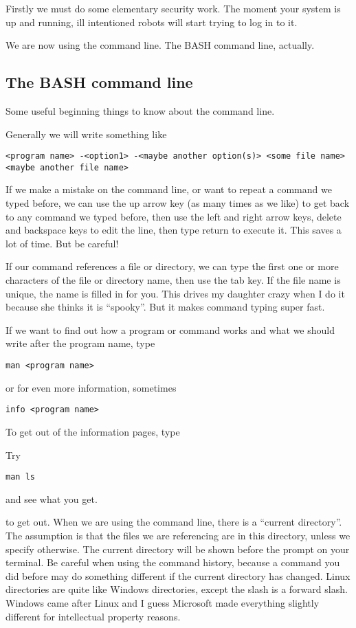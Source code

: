 \documentclass[12pt,a4paper]{article}
\begin{document}
Firstly we must do some elementary security work. The moment your system is up and running, ill intentioned robots will start trying to log in to it. 

We are now using the command line. The BASH command line, actually.

\subsection*{The BASH command line}
Some useful beginning things to know about the command line.

Generally we will write something like 

\begin{lstlisting}
<program name> -<option1> -<maybe another option(s)> <some file name>  <maybe another file name>
\end{lstlisting}


If we make a mistake on the command line, or want to repeat a command we typed before, we can use the up arrow key (as many times as we like) to get back to any command we typed before, then use the left and right arrow keys, delete and backspace keys to edit the line, then type return to execute it. This saves a lot of time. But be careful!

If our command references a file or directory, we can type the first one or more characters of the file or directory name, then use the tab key. If the file name is unique, the name is filled in for you. This drives my daughter crazy when I do it because she thinks it is “spooky”. But it makes command typing super fast. 

If we want to find out how a program or command works and what we should write after the program name, type
\begin{lstlisting}
man <program name>
\end{lstlisting}
or for even more information, sometimes
\begin{lstlisting}
info <program name>  
\end{lstlisting}
To get out of the information pages, type 



Try 
\begin{lstlisting}
man ls
\end{lstlisting}
and see what you get.



to get out.
When we are using the command line, there is a “current directory”. The assumption is that the files we are referencing are in this directory, unless we specify otherwise. The current directory will be shown before the prompt on your terminal. Be careful when using the command history, because a command you did before may do something different if the current directory has changed. Linux directories are quite like Windows directories, except the slash is a forward slash. Windows came after Linux and I guess Microsoft made everything slightly different for intellectual property reasons.
\end{document}
